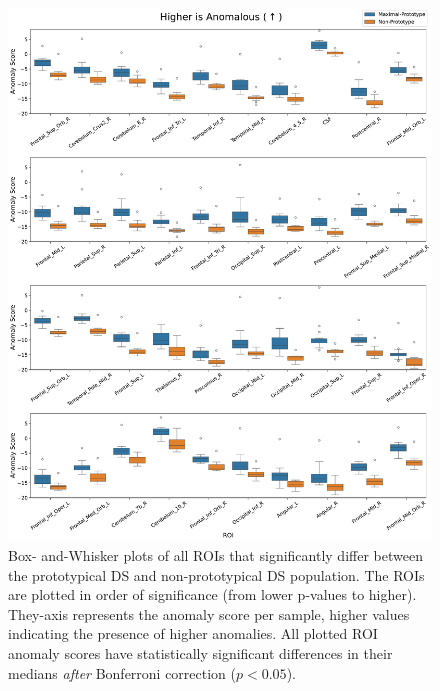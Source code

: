 \begin{figure}[ht]
\centering
\includegraphics[width=\textwidth]{figures/roi_full_boxplot.pdf}
\caption{Box- and-Whisker plots of all ROIs that significantly differ between the prototypical DS and non-prototypical DS population. The ROIs are plotted in order of significance (from lower p-values to higher).  They-axis represents the anomaly score per sample, higher values indicating the presence of higher anomalies. All plotted ROI anomaly scores have statistically significant differences in their medians \textit{after} Bonferroni correction ($p < 0.05$). }
\label{fig:roi-box-full-ds}
\end{figure}




